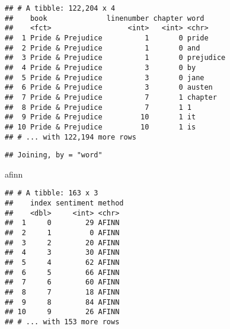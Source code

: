 \documentclass[]{article}
\newenvironment{Shaded}{\begin{snugshade}}{\end{snugshade}}
\newcommand{\KeywordTok}[1]{\textcolor[rgb]{0.13,0.29,0.53}{\textbf{#1}}}
\newcommand{\DataTypeTok}[1]{\textcolor[rgb]{0.13,0.29,0.53}{#1}}
\newcommand{\DecValTok}[1]{\textcolor[rgb]{0.00,0.00,0.81}{#1}}
\newcommand{\StringTok}[1]{\textcolor[rgb]{0.31,0.60,0.02}{#1}}
\newcommand{\OperatorTok}[1]{\textcolor[rgb]{0.81,0.36,0.00}{\textbf{#1}}}
\newcommand{\NormalTok}[1]{#1}
\begin{document}
\begin{verbatim}
## # A tibble: 122,204 x 4
##    book              linenumber chapter word     
##    <fct>                  <int>   <int> <chr>    
##  1 Pride & Prejudice          1       0 pride    
##  2 Pride & Prejudice          1       0 and      
##  3 Pride & Prejudice          1       0 prejudice
##  4 Pride & Prejudice          3       0 by       
##  5 Pride & Prejudice          3       0 jane     
##  6 Pride & Prejudice          3       0 austen   
##  7 Pride & Prejudice          7       1 chapter  
##  8 Pride & Prejudice          7       1 1        
##  9 Pride & Prejudice         10       1 it       
## 10 Pride & Prejudice         10       1 is       
## # ... with 122,194 more rows
\end{verbatim}

\begin{Shaded}
\end{Shaded}

\begin{verbatim}
## Joining, by = "word"
\end{verbatim}

\begin{Shaded}
\begin{Highlighting}[]
\NormalTok{afinn}
\end{Highlighting}
\end{Shaded}

\begin{verbatim}
## # A tibble: 163 x 3
##    index sentiment method
##    <dbl>     <int> <chr> 
##  1     0        29 AFINN 
##  2     1         0 AFINN 
##  3     2        20 AFINN 
##  4     3        30 AFINN 
##  5     4        62 AFINN 
##  6     5        66 AFINN 
##  7     6        60 AFINN 
##  8     7        18 AFINN 
##  9     8        84 AFINN 
## 10     9        26 AFINN 
## # ... with 153 more rows
\end{verbatim}
\end{document}
